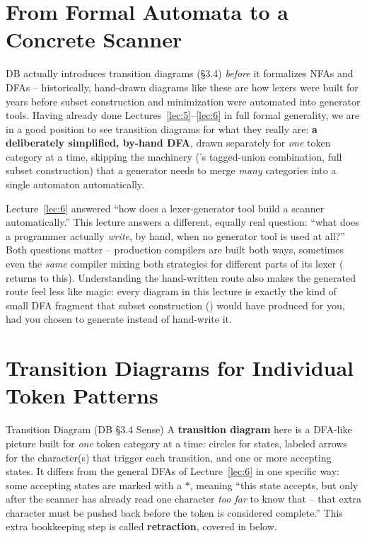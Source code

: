 \documentclass[full-course-notes.tex]{subfiles}
\begin{document}
\section{From Formal Automata to a Concrete Scanner}
\label{sec:l7-motivation}

\dbtag DB actually introduces transition diagrams (\S3.4) \emph{before} it formalizes NFAs and
DFAs -- historically, hand-drawn diagrams like these are how lexers were built for years before
subset construction and minimization were automated into generator tools. Having already done
Lectures~\ref{lec:5}--\ref{lec:6} in full formal generality, we are in a good position to see
transition diagrams for what they really are: \textbf{a deliberately simplified, by-hand DFA},
drawn separately for \emph{one} token category at a time, skipping the machinery
('s tagged-union combination, full subset construction) that a
generator needs to merge \emph{many} categories into a single automaton automatically.

\begin{coreidea}
Lecture~\ref{lec:6} answered ``how does a lexer-generator tool build a scanner automatically.''
This lecture answers a different, equally real question: ``what does a programmer actually
\emph{write}, by hand, when no generator tool is used at all?'' Both questions matter --
production compilers are built both ways, sometimes even the \emph{same} compiler mixing both
strategies for different parts of its lexer ( returns to this).
Understanding the hand-written route also makes the generated route feel less like magic: every
diagram in this lecture is exactly the kind of small DFA fragment that subset construction
() would have produced for you, had you chosen to generate
instead of hand-write it.
\end{coreidea}

\section{Transition Diagrams for Individual Token Patterns}
\label{sec:l7-diagrams}

\begin{defbox}{Transition Diagram (DB \S3.4 Sense)}
A \textbf{transition diagram} here is a DFA-like picture built for \emph{one} token category at
a time: circles for states, labeled arrows for the character(s) that trigger each transition,
and one or more accepting states. It differs from the general DFAs of Lecture~\ref{lec:6} in
one specific way: some accepting states are marked with a \textbf{$*$}, meaning ``this state
accepts, but only after the scanner has already read one character \emph{too far} to know that
-- that extra character must be pushed back before the token is considered complete.'' This
extra bookkeeping step is called \textbf{retraction}, covered in 
below.
\end{defbox}
\end{document}
